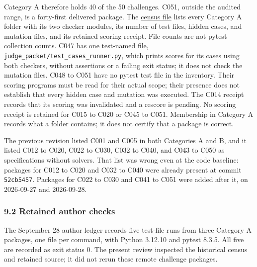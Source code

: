 \documentclass[
  11pt,
]{article}
\newcommand{\passthrough}[1]{#1}
\begin{document}
Category A therefore holds 40 of the 50 challenges. C051, outside the
audited range, is a forty-first delivered package. The
\href{https://github.com/dbccpage/the_symbol_game/blob/main/education/documentation/030_pfp_proposal_fidelity_protocol_pfp/papers/symbol_game/008_pfp_mssn_tower_challenges_and_retraction_benchmarks/docs/challenge_census.md}{census
file} lists every Category A folder with its two checker modules, its
number of test files, hidden cases, and mutation files, and its retained
scoring receipt. File counts are not pytest collection counts. C047 has
one test-named file, \nolinkurl{judge_packet/test_cases_runner.py},
which prints scores for its cases using both checkers, without
assertions or a failing exit status; it does not check the mutation
files. C048 to C051 have no pytest test file in the inventory. Their
scoring programs must be read for their actual scope; their presence
does not establish that every hidden case and mutation was executed. The
C014 receipt records that its scoring was invalidated and a rescore is
pending. No scoring receipt is retained for C015 to C020 or C045 to
C051. Membership in Category A records what a folder contains; it does
not certify that a package is correct.

The previous revision listed C001 and C005 in both Categories A and B,
and it listed C012 to C020, C022 to C030, C032 to C040, and C043 to C050
as specifications without solvers. That list was wrong even at the code
baseline: packages for C012 to C020 and C032 to C040 were already
present at commit \passthrough{\lstinline!52cb5457!}. Packages for C022
to C030 and C041 to C051 were added after it, on 2026-09-27 and
2026-09-28.

\hypertarget{retained-author-checks}{%
\subsubsection{9.2 Retained author
checks}\label{retained-author-checks}}

The September 28 author ledger records five test-file runs from three
Category A packages, one file per command, with Python 3.12.10 and
pytest 8.3.5. All five are recorded as exit status 0. The present review
inspected the historical census and retained source; it did not rerun
these remote challenge packages.
\end{document}
